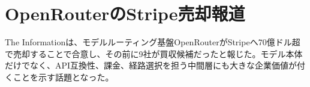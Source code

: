 \section{OpenRouterのStripe売却報道}
The Informationは、モデルルーティング基盤OpenRouterがStripeへ70億ドル超で売却することで合意し、その前に9社が買収候補だったと報じた。モデル本体だけでなく、API互換性、課金、経路選択を担う中間層にも大きな企業価値が付くことを示す話題となった。
